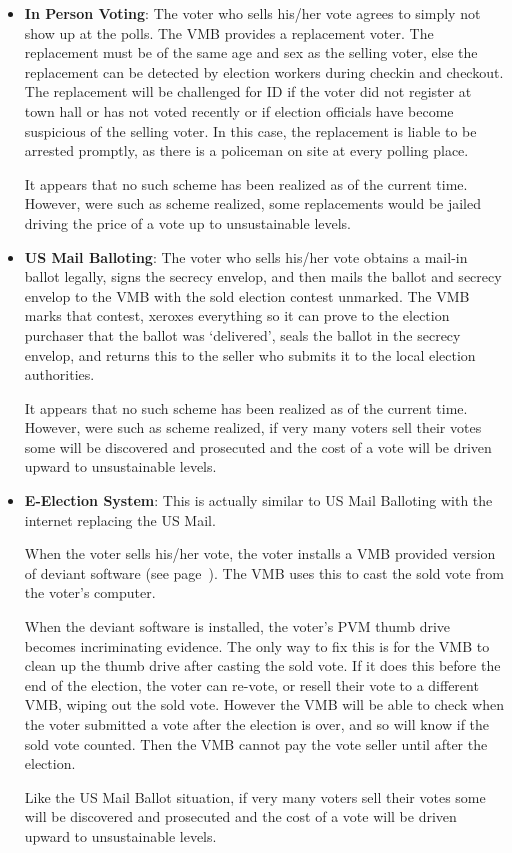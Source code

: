 \documentclass[12pt]{article}
\newcommand{\pagref}[1]{(see page~\pageref{#1})}
\begin{document}
\begin{itemize}
\item
{\bf In Person Voting}:
The voter who sells his/her vote agrees to simply not show
up at the polls.  The VMB provides a replacement voter.
The replacement must be of the same age and sex as the selling
voter, else the replacement can be detected by election workers
during checkin and checkout.  The replacement will be challenged
for ID if the voter did not register at town hall or has not
voted recently or if election officials have become suspicious
of the selling voter.  In this case, the replacement is liable to
be arrested promptly, as there is a policeman on site at every polling
place.

It appears that no such scheme has been realized as of
the current time.  However, were such as scheme realized,
some replacements would be jailed driving the price
of a vote up to unsustainable levels.

\item
{\bf US Mail Balloting}:
The voter who sells his/her vote obtains a mail-in ballot
legally, signs the secrecy envelop, and then mails the
ballot and secrecy envelop to the VMB with the sold election
contest unmarked.  The VMB marks that contest, xeroxes
everything so it can prove to the election purchaser
that the ballot was `delivered', seals the ballot in the
secrecy envelop, and returns this
to the seller who submits it to the local election
authorities.  

It appears that no such scheme has been realized as of
the current time.  However, were such as scheme realized,
if very many voters
sell their votes some will be discovered and prosecuted and the cost of
a vote will be driven upward to unsustainable levels.

\item
{\bf E-Election System}:
This is actually similar to US Mail Balloting with the internet
replacing the US Mail.

When the voter sells his/her vote, the voter installs a VMB
provided version of deviant software \pagref{DEVIANT-SOFTWARE}.
The VMB uses this to
cast the sold vote from the voter's computer.

When the deviant software is installed, the voter's PVM thumb
drive becomes incriminating evidence.  The only way to fix
this is for the VMB to clean up the thumb drive after casting
the sold vote.  If it does this before the end of the
election, the voter can re-vote, or resell their vote to a
different VMB, wiping out the sold vote.
However the VMB will be able to check when the voter submitted
a vote after the election is over, and so will know if the
sold vote counted.  Then the VMB cannot pay the vote seller
until after the election.

Like the US Mail Ballot situation, if very many voters
sell their votes some will be discovered and prosecuted and the cost of
a vote will be driven upward to unsustainable levels.
\end{itemize}
\end{document}
